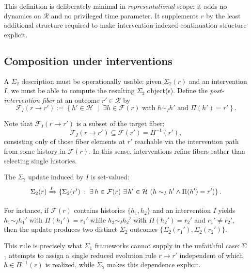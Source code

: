 This definition is deliberately minimal in \emph{representational} scope: it adds no dynamics on
$\mathcal{R}$ and no privileged time parameter. It supplements $r$ by the least additional
structure required to make intervention-indexed continuation structure explicit.

\subsection{Composition under interventions}

A $\Sigma_2$ description must be operationally usable: given $\Sigma_2(r)$ and an intervention $I$,
we must be able to compute the resulting $\Sigma_2$ object(s). Define the \emph{post-intervention fiber}
at an outcome $r'\in\mathcal{R}$ by
\begin{equation}
\mathcal{F}_I(r \to r') := \left\{ h' \in \mathcal{H} \;\middle|\;
\exists h \in \mathcal{F}(r)\text{ with } h \sim_I h' \text{ and } \Pi(h')=r'
\right\}.
\end{equation}

Note that $\mathcal{F}_I(r \to r')$ is a subset of the target fiber:
\begin{equation}
\mathcal{F}_I(r \to r') \subseteq \mathcal{F}(r') = \Pi^{-1}(r'),
\end{equation}
consisting only of those fiber elements at $r'$ reachable via the intervention path from some
history in $\mathcal{F}(r)$. In this sense, interventions refine fibers rather than selecting
single histories.

The $\Sigma_2$ update induced by $I$ is set-valued:
\begin{equation}
\Sigma_2(r) \xRightarrow[]{I}
\left\{
\Sigma_2(r') \;:\; \exists\, h\in\mathcal{F}(r)\ \exists\,h'\in\mathcal{H}\ (h\sim_I h' \wedge \Pi(h')=r')
\right\}.
\end{equation}

For instance, if $\mathcal{F}(r)$ contains histories $\{h_1,h_2\}$ and an intervention $I$ yields
$h_1\sim_I h_1'$ with $\Pi(h_1')=r_1'$ while $h_2\sim_I h_2'$ with $\Pi(h_2')=r_2'$ and
$r_1'\neq r_2'$, then the update produces two distinct $\Sigma_2$ outcomes
$\{\Sigma_2(r_1'),\Sigma_2(r_2')\}$.

This rule is precisely what $\Sigma_1$ frameworks cannot supply in the unfaithful case: Σ$_1$ attempts
to assign a single reduced evolution rule $r \mapsto r'$ independent of which $h\in\Pi^{-1}(r)$
is realized, while $\Sigma_2$ makes this dependence explicit.

